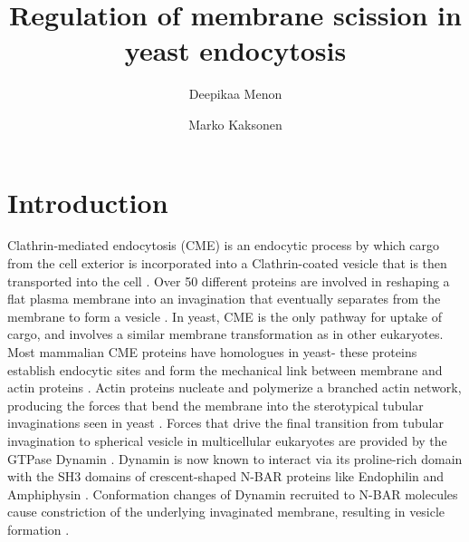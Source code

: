 \documentclass[9pt,lineno]{elife}
\title{Regulation of membrane scission in yeast endocytosis}
\author[1]{Deepikaa Menon}
\author[1*]{Marko Kaksonen}
\affil[1]{Department of Biochemistry, University of Geneva, Geneva, Switzerland}
\begin{document}
\maketitle

\begin{abstract}

\end{abstract}


\section{Introduction}

Clathrin-mediated endocytosis (CME) is an endocytic process by which cargo from the cell exterior is incorporated into a Clathrin-coated vesicle that is then transported into the cell  \citep{Bitsikas2014}. Over 50 different proteins are involved in reshaping a flat plasma membrane into an invagination that eventually separates from the membrane to form a vesicle \citep{Kaksonen2018}. In yeast, CME is the only pathway for uptake of cargo, and involves a similar membrane transformation as in other eukaryotes. Most mammalian CME proteins have homologues in yeast- these proteins establish endocytic sites and form the mechanical link between membrane and actin proteins \citep{Kaksonen2018}. Actin proteins nucleate and polymerize a branched actin network, producing the forces that bend the membrane into the sterotypical tubular invaginations seen in yeast \citep{Kubler1993a, Kaksonen2003}. Forces that drive the final transition from tubular invagination to spherical vesicle in multicellular eukaryotes are provided by the GTPase Dynamin \citep{Grigliatti1973, Sweitzer1998, Ferguson2007,Takei1995, Galli2017}. Dynamin is now known to interact via its proline-rich domain with the SH3 domains of crescent-shaped N-BAR proteins like Endophilin and Amphiphysin  \citep{Grabs1997,Cestra1999,Farsad2001,Ferguson2009,Meinecke2013b}. Conformation changes of Dynamin recruited to N-BAR molecules cause constriction of the underlying invaginated membrane, resulting in vesicle formation  \citep{Shupliakov1997,Zhang2001,Zhao2016}.

~\\
\end{document}
